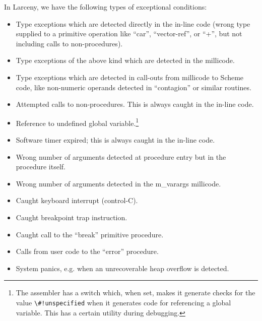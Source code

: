 In Larceny, we have the following types of exceptional conditions:

\begin{itemize}

\item 
Type exceptions which are detected directly in the in-line code (wrong
type supplied to a primitive operation like ``car'', ``vector-ref'', or ``+'',
but not including calls to non-procedures).

\item
Type exceptions of the above kind which are detected in the millicode.

\item
Type exceptions which are detected in call-outs from millicode to Scheme
code, like non-numeric operands detected in ``contagion'' or similar routines.

\item
Attempted calls to non-procedures. This is always caught in the in-line code.

\item
Reference to undefined global variable.\footnote{The assembler has a switch
which, when set, makes it generate checks for the value \verb+\#!unspecified+
when it generates code for referencing a global variable. This has a certain
utility during debugging.}

\item
Software timer expired; this is always caught in the in-line code.

\item
Wrong number of arguments detected at procedure entry but in the procedure
itself.

\item
Wrong number of arguments detected in the {\sc m\_varargs} millicode.

\item
Caught keyboard interrupt (control-C).

\item
Caught breakpoint trap instruction.

\item
Caught call to the ``break'' primitive procedure.

\item
Calls from user code to the ``error'' procedure.

\item
System panics, e.g. when an unrecoverable heap overflow is detected.
\end{itemize}

